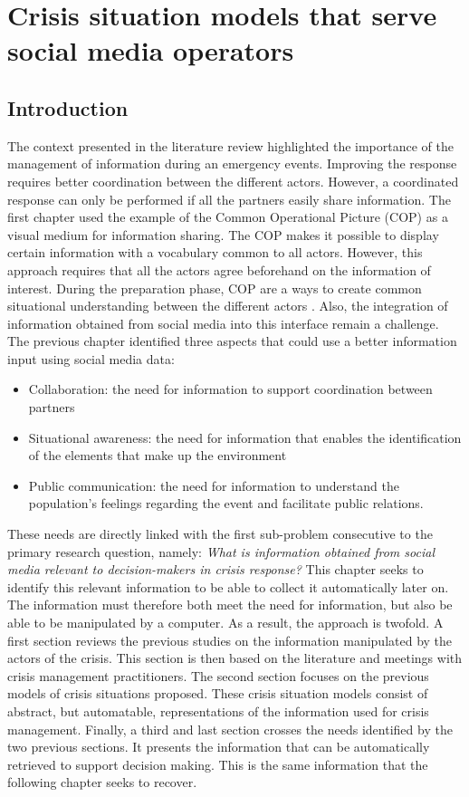 \chapter{Crisis situation models that serve social media operators}

\section*{Introduction}
The context presented in the literature review highlighted the importance of the management of information during an emergency events.
Improving the response requires better coordination between the different actors.
However, a coordinated response can only be performed if all the partners easily share information.
The first chapter used the example of the Common Operational Picture (COP) as a visual medium for information sharing.
The COP makes it possible to display certain information with a vocabulary common to all actors.
However, this approach requires that all the actors agree beforehand on the information of interest.
During the preparation phase, COP are a ways to create common situational understanding between the different actors \parencite{steen-tveitCommonOperationalPicture2021}.
Also, the integration of information obtained from social media into this interface remain a challenge.
The previous chapter identified three aspects that could use a better information input using social media data:

\begin{itemize}
    \item Collaboration: the need for information to support coordination between partners
    \item Situational awareness: the need for information that enables the identification of the elements that make up the environment
    \item Public communication: the need for information to understand the population's feelings regarding the event and facilitate public relations.
\end{itemize}

These needs are directly linked with the first sub-problem consecutive to the primary research question, namely: \emph{What is information obtained from social media relevant to decision-makers in crisis response?}
This chapter seeks to identify this relevant information to be able to collect it automatically later on.
The information must therefore both meet the need for information, but also be able to be manipulated by a computer.
As a result, the approach is twofold.
A first section reviews the previous studies on the information manipulated by the actors of the crisis.
This section is then based on the literature and meetings with crisis management practitioners.
The second section focuses on the previous models of crisis situations proposed.
These crisis situation models consist of abstract, but automatable, representations of the information used for crisis management.
Finally, a third and last section crosses the needs identified by the two previous sections.
It presents the information that can be automatically retrieved to support decision making.
This is the same information that the following chapter seeks to recover.

